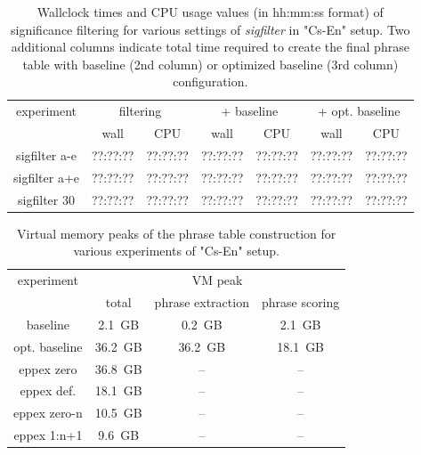 \begin{table}[ht]
\centering
\begin{tabular}{ | c | c c | c c | c c | }
\hline
experiment & \multicolumn{2}{|c|}{filtering} & \multicolumn{2}{|c|}{+ baseline} & \multicolumn{2}{|c|}{+ opt. baseline} \\
 & wall & CPU & wall & CPU & wall & CPU \\
\hline
\hline
sigfilter a-e & ??:??:?? & ??:??:?? & ??:??:?? & ??:??:?? & ??:??:?? & ??:??:?? \\
sigfilter a+e & ??:??:?? & ??:??:?? & ??:??:?? & ??:??:?? & ??:??:?? & ??:??:?? \\
sigfilter 30  & ??:??:?? & ??:??:?? & ??:??:?? & ??:??:?? & ??:??:?? & ??:??:?? \\
\hline
\end{tabular}
\caption{\label{cs-en-wmt13-sigfilter-time-benchmarks}Wallclock times and CPU usage values
(in hh:mm:ss format) of significance filtering for various settings of \emph{sigfilter}
in "Cs-En" setup. Two additional columns indicate total time required to create the final
phrase table with baseline (2nd column) or optimized baseline (3rd column) configuration.}
\end{table}


\begin{table}[ht]
\centering
\begin{tabular}{ | c | c c c | }
\hline
experiment & \multicolumn{3}{|c|}{VM peak} \\
 & total & phrase extraction & phrase scoring \\
\hline
\hline
baseline       &  2.1~GB &  0.2~GB &  2.1~GB \\
opt. baseline  & 36.2~GB & 36.2~GB & 18.1~GB \\
eppex zero     & 36.8~GB &      -- &      -- \\
\hline
eppex def.     & 18.1~GB &      -- &      -- \\
eppex zero-n   & 10.5~GB &      -- &      -- \\
eppex 1:n+1    &  9.6~GB &      -- &      -- \\
\hline
\end{tabular}
\caption{\label{cs-en-wmt13-vm-peak-benchmarks}Virtual memory peaks of
the phrase table construction for various experiments of "Cs-En" setup.}
\end{table}

